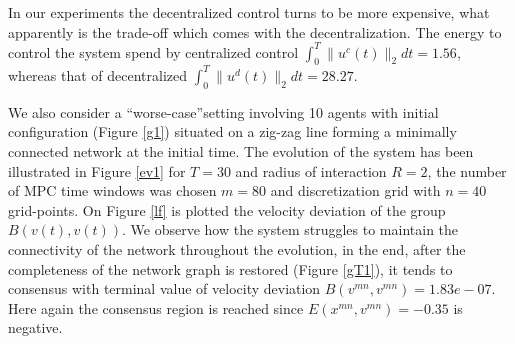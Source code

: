 \documentclass[a4paper,10pt, english]{article}
\begin{document}
In our experiments the decentralized control turns to be more expensive, what apparently is the trade-off which comes with the decentralization. 
The energy to control the system spend by centralized control  $\int_{0}^{T} \|u^c(t)\|_2 dt  = 1.56$, whereas that of decentralized $\int_{0}^{T} \|u^d(t)\|_2 dt  = 28.27$.


 
We also  consider a \textquotedblleft worse-case\textquotedblright setting involving 10 agents with initial configuration (Figure \ref{g1}) situated on a  zig-zag line forming a minimally connected network at the initial time. The evolution of the system has been illustrated in Figure \ref{ev1} for $T = 30$ and radius of interaction $R = 2$, the number of MPC time windows was chosen $m = 80$  and discretization grid with $n = 40$ grid-points.  On Figure \ref{lf} is plotted the velocity deviation of the group $B(v(t), v(t))$. We observe how the system struggles to maintain the connectivity of the network throughout the evolution, in the end, after the completeness of the network graph is restored (Figure \ref{gT1}), it tends to consensus with terminal value of velocity deviation $B(v^{mn}, v^{mn}) = 1.83e-07$. Here again the consensus region is reached since $E(x^{mn}, v^{mn}) = -0.35$ is negative. 
 
\end{document}
